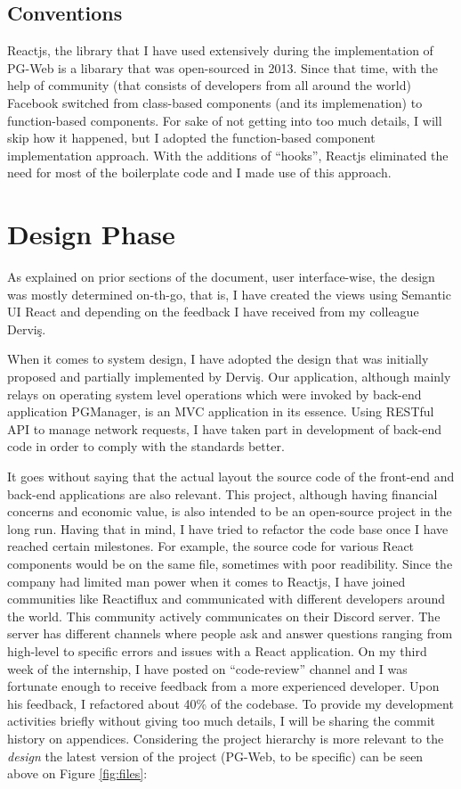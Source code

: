 \subsection{Conventions}

Reactjs, the library that I have used extensively during the implementation 
of PG-Web is a libarary that was open-sourced in 2013. Since that time, 
with the help of community (that consists of developers from all around the 
world) Facebook switched from class-based components (and its implemenation) 
to function-based components. For sake of not getting into too much details, 
I will skip how it happened, but I adopted the function-based component 
implementation approach. With the additions of ``hooks'', Reactjs eliminated 
the need for most of the boilerplate code and I made use of this approach.

\section{Design Phase}
As explained on prior sections of the document, user interface-wise, the 
design was mostly determined on-th-go, that is, I have created the views 
using Semantic UI React and depending on the feedback I have received from 
my colleague Derviş.
\par
When it comes to system design, I have adopted the design that was initially 
proposed and partially implemented by Derviş. Our application, although 
mainly relays on operating system level operations which were invoked by 
back-end application PGManager, is an MVC application in its essence. 
Using RESTful API to manage network requests, I have taken part in 
development of back-end code in order to comply with the standards better.
\par
It goes without saying that the actual layout the source code of the 
front-end and back-end applications are also relevant. This project, 
although having financial concerns and economic value, is also intended 
to be an open-source project in the long run. Having that in mind, I have 
tried to refactor the code base once I have reached certain milestones. 
For example, the source code for various React components would be on the 
same file, sometimes with poor readibility. Since the company had limited 
man power when it comes to Reactjs, I have joined communities like Reactiflux 
and communicated with different developers around the world. This community 
actively communicates on their Discord server. The server has different 
channels where people ask and answer questions ranging from high-level to 
specific errors and issues with a React application. On my third week of the 
internship, I have posted on ``code-review'' channel and I was fortunate 
enough to receive feedback from a more experienced developer. Upon his 
feedback, I refactored about 40\% of the codebase. To provide my development 
activities briefly without giving too much details, I will be sharing the 
commit history on appendices. Considering the project hierarchy is more 
relevant to the \textit{design} the latest version of the project 
(PG-Web, to be specific) can be seen above on Figure \ref{fig:files}:

